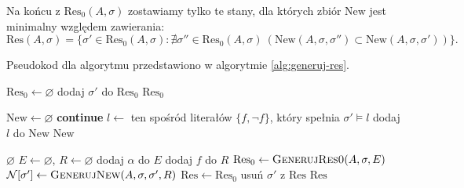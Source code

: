 \documentclass[11pt,a4paper]{article}
\theoremstyle{definition}
\begin{document}
Na końcu z $\mathrm{Res}_0(A,\sigma)$ zostawiamy tylko te stany, dla których zbiór $\mathrm{New}$ jest minimalny względem zawierania:
\[
\mathrm{Res}(A,\sigma)=
\{\sigma' \in \mathrm{Res}_0(A,\sigma) :
\nexists \sigma'' \in \mathrm{Res}_0(A,\sigma)\ 
(\mathrm{New}(A,\sigma,\sigma'') \subset \mathrm{New}(A,\sigma,\sigma'))\}.
\]

Pseudokod dla algorytmu przedstawiono w algorytmie \ref{alg:generuj-res}.

\begin{algorithm}[H]
\caption{Pseudokod dla algorytmu wyznaczający funkcję $\mathrm{Res}$}
\label{alg:generuj-res}
\begin{algorithmic}[1]
        \State $\mathrm{Res}_0 \gets \varnothing$
                \State dodaj $\sigma'$ do $\mathrm{Res}_0$
            \EndIf
        \EndFor
        \State \Return $\mathrm{Res}_0$
    \EndProcedure

        \State $\mathrm{New} \gets \varnothing$
                \State \textbf{continue}
            \EndIf
            \State $l \gets$ ten spośród literałów $\{f, \neg f\}$, który spełnia $\sigma' \models l$
            \If{$\sigma(f) \neq \sigma'(f)$ \textbf{lub} $f \in R$}
                \State dodaj $l$ do $\mathrm{New}$
            \EndIf
        \EndFor
        \State \Return $\mathrm{New}$
    \EndProcedure

            \If{$\sigma \models \pi$}
                \State \Return $\varnothing$
            \EndIf
        \EndFor
        \State $E \gets \varnothing$, $R \gets \varnothing$
            \If{$\sigma \models \pi$}
                \State dodaj $\alpha$ do $E$
            \EndIf
        \EndFor
            \If{$\sigma \models \pi$}
                \State dodaj $f$ do $R$
            \EndIf
        \EndFor
        \State $\mathrm{Res}_0 \gets \Call{GenerujRes0}{A, \sigma, E}$
        \ForAll{$\sigma' \in \mathrm{Res}_0$}
            \State $\mathcal{N}[\sigma'] \gets \Call{GenerujNew}{A, \sigma, \sigma', R}$
        \EndFor
        \State $\mathrm{Res} \gets \mathrm{Res}_0$
                \State usuń $\sigma'$ z $\mathrm{Res}$
            \EndIf
        \EndFor
        \State \Return $\mathrm{Res}$
    \EndProcedure
\end{algorithmic}
\end{algorithm}
\end{document}
